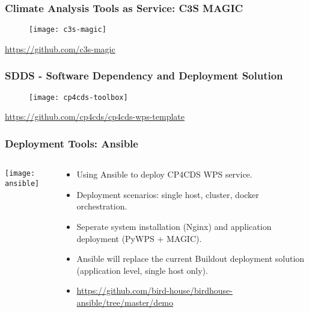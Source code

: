 \documentclass{beamer}
\begin{document}
\begin{frame}
\frametitle<presentation>{Climate Analysis Tools as Service: C3S MAGIC}

  \begin{figure}[ht]
    \centering
    \texttt{[image: c3s-magic]}
  \end{figure}

  \centering
  \footnotesize{\url{https://github.com/c3s-magic}}

\end{frame}

\begin{frame}
\frametitle<presentation>{SDDS - Software Dependency and Deployment Solution}

  \begin{figure}[ht]
    \centering
    \texttt{[image: cp4cds-toolbox]}
  \end{figure}

  \centering
  \footnotesize{\url{https://github.com/cp4cds/cp4cds-wps-template}}

\end{frame}

\begin{frame}
\frametitle<presentation>{Deployment Tools: Ansible}
  \begin{columns}[c]
    \begin{column}{.2\textwidth}
      \texttt{[image: ansible]}
    \end{column}
    \begin{column}{.8\textwidth}
      \begin{itemize}
        \item Using Ansible to deploy CP4CDS WPS service.
        \item Deployment scenarios: single host, cluster, docker orchestration.
        \item Seperate system installation (Nginx) and application deployment (PyWPS + MAGIC).
        \item Ansible will replace the current Buildout deployment solution (application level, single host only).
        \item \footnotesize{\url{https://github.com/bird-house/birdhouse-ansible/tree/master/demo}}
      \end{itemize}
    \end{column}
  \end{columns}
\end{frame}
\end{document}
